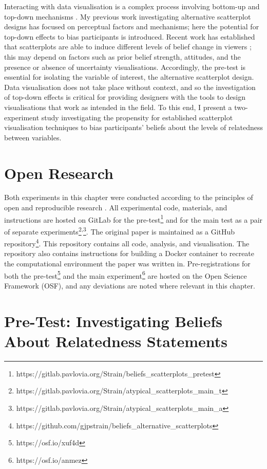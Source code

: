 \documentclass[../main.tex]{subfiles}
\begin{document}
Interacting with data visualisation is a complex process involving
bottom-up and top-down mechanisms
\cite{shah_2011, franconeri_2021, xiong_2023}. My previous work
investigating alternative scatterplot designs has focused on perceptual
factors and mechanisms; here the potential for top-down effects to bias
participants is introduced. Recent work has established that
scatterplots are able to induce different levels of belief change in
viewers \cite{karduni_2021, markant_2023}; this may depend on factors
such as prior belief strength, attitudes, and the presence or absence of
uncertainty visualisations. Accordingly, the pre-test is essential for
isolating the variable of interest, the alternative scatterplot design.
Data visualisation does not take place without context, and so the
investigation of top-down effects is critical for providing designers
with the tools to design visualisations that work as intended in the
field. To this end, I present a two-experiment study investigating the
propensity for established scatterplot visualisation techniques to bias
participants' beliefs about the levels of relatedness between variables.

\section{Open Research}\label{open-research-chap7}

Both experiments in this chapter were conducted according to the
principles of open and reproducible research \cite{ayris_2018}. All
experimental code, materials, and instructions are hosted on GitLab for
the pre-test\footnote{https://gitlab.pavlovia.org/Strain/beliefs\_scatterplots\_pretest}
and for the main test as a pair of separate
experiments\footnote{https://gitlab.pavlovia.org/Strain/atypical\_scatterplots\_main\_t}\textsuperscript{,}\footnote{https://gitlab.pavlovia.org/Strain/atypical\_scatterplots\_main\_a}.
The original paper is maintained as a GitHub repository\footnote{https://github.com/gjpstrain/beliefs\_alternative\_scatterplots}.
This repository contains all code, analysis, and visualisation. The
repository also contains instructions for building a Docker container to
recreate the computational environment the paper was written in.
Pre-registrations for both the pre-test\footnote{https://osf.io/xuf4d}
and the main experiment\footnote{https://osf.io/anmez} are hosted on the
Open Science Framework (OSF), and any deviations are noted where
relevant in this chapter.

\section{Pre-Test: Investigating Beliefs About Relatedness
Statements}\label{beliefs-e5a}
\end{document}
